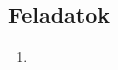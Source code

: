\documentclass{szb-practice}
\begin{document}

\clearpage
\subsection{Feladatok}

\begin{enumerate}
  \item
\end{enumerate}




\end{document}
